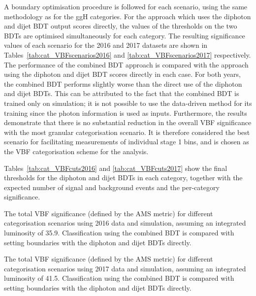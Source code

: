 A boundary optimisation procedure is followed for each scenario, 
using the same methodology as for the ggH categories.
For the approach which uses the diphoton and dijet BDT output scores directly, 
the values of the thresholds on the two BDTs are optimised simultaneously for each category.
The resulting significance values of each scenario for the 2016 and 2017 datasets 
are shown in Tables~\ref{tab:cat_VBFscenarios2016} and \ref{tab:cat_VBFscenarios2017} respectively.
The performance of the combined BDT approach is compared with the approach using the diphoton 
and dijet BDT scores directly in each case.
For both years, the combined BDT performs slightly worse 
than the direct use of the diphoton and dijet BDTs.
This can be attributed to the fact that the combined BDT is trained only on simulation; 
it is not possible to use the data-driven method for its training 
since the photon information is used as inputs.
Furthermore, the results demonstrate that there is no substantial reduction 
in the overall VBF significance with the most granular categorisation scenario.
It is therefore considered the best scenario for facilitating measurements of individual stage 1 bins, 
and is chosen as the VBF categorisation scheme for the analysis.

Tables~\ref{tab:cat_VBFcuts2016} and \ref{tab:cat_VBFcuts2017} show the final thresholds 
for the diphoton and dijet BDTs in each category, 
together with the expected number of signal and background events and the per-category significance.

\begin{table}
  \begin{centering}
    
    \caption[Comparison of 2016 VBF categorisation scenarios.]
    {
      The total VBF significance (defined by the AMS metric) for different categorisation scenarios 
      using 2016 data and simulation, assuming an integrated luminosity of \SI{35.9}{\fbinv}.
      Classification using the combined BDT is compared with setting boundaries with the 
      diphoton and dijet BDTs directly.
    }
    \label{tab:cat_VBFscenarios2016}
  \end{centering}
\end{table}

\begin{table}
  \begin{centering}
    
    \caption[Comparison of 2017 VBF categorisation scenarios.]
    {
      The total VBF significance (defined by the AMS metric) for different categorisation scenarios 
      using 2017 data and simulation, assuming an integrated luminosity of \SI{41.5}{\fbinv}.
      Classification using the combined BDT is compared with setting boundaries with the 
      diphoton and dijet BDTs directly.
    }
    \label{tab:cat_VBFscenarios2017}
  \end{centering}
\end{table}

